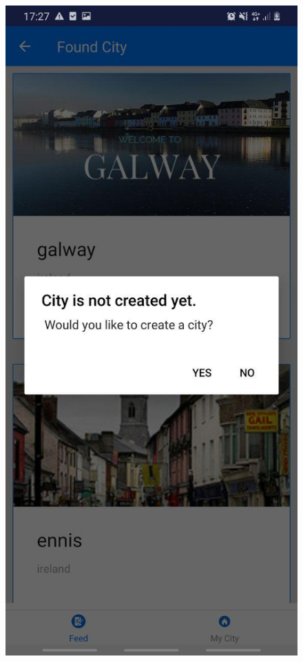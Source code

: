 \begin{figure}[h!]
\begin{minipage}[t]{0.48\textwidth}
\includegraphics[width=\linewidth,keepaspectratio=true]{img/city_is_not_created.jpg}

\end{minipage}
\end{figure}

